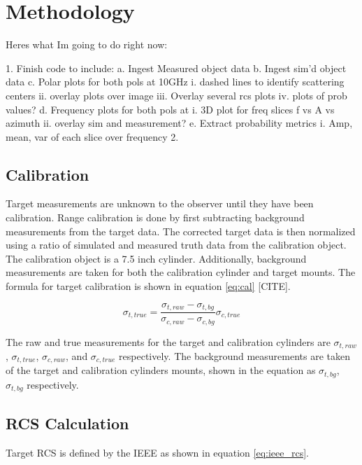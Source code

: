 \chapter{Methodology}
\label{ch:methodology}
\glsresetall

{
Heres what Im going to do right now:


1. Finish code to include:
  a. Ingest Measured object data
  b. Ingest sim'd object data
  c. Polar plots for both pols at 10GHz
    i. dashed lines to identify scattering centers
    ii. overlay plots over image
    iii. Overlay several rcs plots
    iv. plots of prob values?
  d. Frequency plots for both pols at
    i. 3D plot for freq slices f vs A vs azimuth
    ii. overlay sim and measurement?
  e. Extract probability metrics
    i. Amp, mean, var of each slice over frequency
2.

}

\section{Calibration}

Target measurements are unknown to the observer until they have been calibration. Range calibration is done by first subtracting background measurements from the target data. The corrected target data is then normalized using a ratio of simulated and measured truth data from the calibration object. The calibration object is a 7.5 inch cylinder. Additionally, background measurements are taken for both the calibration cylinder and target mounts. The formula for target calibration is shown in equation \ref{eq:cal} [CITE].

\begin{equation}\label{eq:cal}
    \sigma_{t, true} = \frac{\sigma_{t, raw} - \sigma_{t, bg}}{\sigma_{c, raw} - \sigma_{c, bg}}\sigma_{c, true}
\end{equation}

The raw and true measurements for the target and calibration cylinders are $\sigma_{t, raw}$, $\sigma_{t, true}$, $\sigma_{c, raw}$, and $\sigma_{c, true}$ respectively. The background measurements are taken of the target and calibration cylinders mounts, shown in the equation as $\sigma_{t, bg}$, $\sigma_{t, bg}$ respectively.

\section{RCS Calculation}

Target RCS is defined by the IEEE as shown in equation \ref{eq:ieee_rcs}\cite{Knott}.


